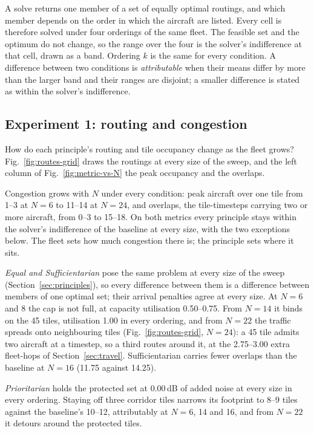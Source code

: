 A solve returns one member of a set of equally optimal routings, and which member depends
on the order in which the aircraft are listed. Every cell is therefore solved under four
orderings of the same fleet. The feasible set and the optimum do not change, so the range
over the four is the solver's indifference at that cell, drawn as a band. Ordering $k$ is
the same for every condition. A difference between two conditions is
\emph{attributable} when their means differ by more than the larger band and their ranges
are disjoint; a smaller difference is stated as within the solver's indifference.

\subsection{Experiment 1: routing and congestion}
\label{sec:routing}

How do each principle's routing and tile occupancy change as the fleet grows?
Fig.~\ref{fig:routes-grid} draws the routings at every size of the sweep, and the left
column of Fig.~\ref{fig:metric-vs-N} the peak occupancy and the overlaps.

Congestion grows with $N$ under every condition: peak aircraft over one tile from 1--3 at
$N=6$ to 11--14 at $N=24$, and overlaps, the tile-timesteps carrying two or more aircraft,
from 0--3 to 15--18. On both metrics every principle stays within the solver's indifference of the
baseline at every size, with the two exceptions below. The fleet sets how much congestion
there is; the principle sets where it sits.

\emph{Equal and Sufficientarian} pose the same problem at every size of the sweep
(Section~\ref{sec:principles}), so every difference between them is a difference between
members of one optimal set; their arrival penalties agree at every size. At $N=6$ and 8
the cap is not full, at capacity utilisation 0.50--0.75. From $N=14$ it binds on the
\SI{45}{\dBA} tiles, utilisation 1.00 in every ordering, and from $N=22$ the traffic
spreads onto neighbouring tiles (Fig.~\ref{fig:routes-grid}, $N=24$): a \SI{45}{\dBA}
tile admits two aircraft at a timestep, so a third routes around it, at the 2.75--3.00
extra fleet-hops of Section~\ref{sec:travel}. Sufficientarian carries fewer overlaps than
the baseline at $N=16$ (11.75 against 14.25).

\emph{Prioritarian} holds the protected set at 0.00\,dB of added noise at every size in
every ordering. Staying off three corridor tiles narrows its footprint to 8--9 tiles
against the baseline's 10--12, attributably at $N=6$, 14 and 16, and from $N=22$ it
detours around the protected tiles.

